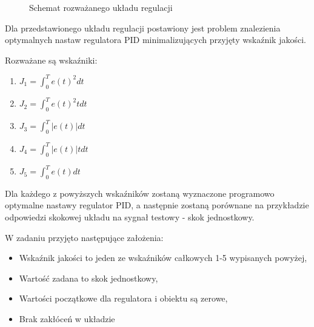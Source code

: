\documentclass[a4paper,11pt]{article}
\begin{document}
\begin{figure}[H]
\centering
{}
\caption{Schemat rozważanego układu regulacji}
\label{fig:opt_par_1}
\end{figure}
\pagestyle{mypage}
Dla przedstawionego układu regulacji postawiony jest problem znalezienia optymalnych nastaw regulatora PID minimalizujących przyjęty wskaźnik jakości. 

Rozważane są wskaźniki: \\
\begin{enumerate}
\item \( J_{1} = \int_{0}^{T}e(t)^{2}dt \)
\item \( J_{2} = \int_{0}^{T}e(t)^{2}tdt \)
\item \( J_{3} = \int_{0}^{T}|e(t)|dt \)
\item \( J_{4} = \int_{0}^{T}|e(t)|tdt \)
\item \( J_{5} = \int_{0}^{T}e(t)dt \)
\end{enumerate}

Dla każdego z powyższych wskaźników zostaną wyznaczone programowo optymalne nastawy regulator PID, a następnie zostaną porównane na przykładzie odpowiedzi skokowej układu na sygnał testowy - skok jednostkowy.

W zadaniu przyjęto następujące założenia:
\begin{itemize}
\item Wskaźnik jakości to jeden ze wskaźników całkowych 1-5 wypisanych powyżej,
\item Wartość zadana to skok jednostkowy,
\item Wartości początkowe dla regulatora i obiektu są zerowe,
\item Brak zakłóceń w układzie
\end{itemize}
\end{document}
